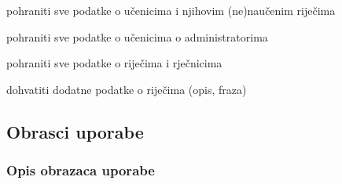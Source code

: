\begin{packed_enum}
	\begin{packed_enum}
		
		\item pohraniti sve podatke o učenicima i njihovim (ne)naučenim riječima
		\item pohraniti sve podatke o učenicima o administratorima 
		\item pohraniti sve podatke o riječima i rječnicima
		
	\end{packed_enum}

	\item  {}
	
	\begin{packed_enum}
		
		\item dohvatiti dodatne podatke o riječima (opis, fraza)
		
	\end{packed_enum}

\end{packed_enum}

\eject

\subsection{Obrasci uporabe}

\subsubsection{Opis obrazaca uporabe}

